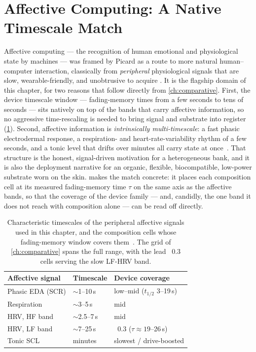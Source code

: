 \documentclass[12pt, twoside]{report}
\begin{document}
\section[Affective Computing]{Affective Computing: A Native Timescale Match}\label{sec:ch4_affect}

Affective computing --- the recognition of human emotional and physiological state by machines --- was framed by Picard as a route to more natural human--computer interaction, classically from \emph{peripheral} physiological signals that are slow, wearable-friendly, and unobtrusive to acquire \cite{Picard1997}. It is the flagship domain of this chapter, for two reasons that follow directly from \cref{ch:comparative}. First, the device timescale window --- fading-memory times from a few seconds to tens of seconds --- sits natively on top of the bands that carry affective information, so no aggressive time-rescaling is needed to bring signal and substrate into register (\cref{tab:ch4_bands}). Second, affective information is \emph{intrinsically multi-timescale}: a fast phasic electrodermal response, a respiration- and heart-rate-variability rhythm of a few seconds, and a tonic level that drifts over minutes all carry state at once~\cite{Boucsein2012EDA,TaskForce1996HRV,ChourpiliadisBhardwaj2022}. That structure is the honest, signal-driven motivation for a heterogeneous bank, and it is also the deployment narrative for an organic, flexible, biocompatible, low-power substrate worn on the skin.  makes the match concrete: it places each composition cell at its measured fading-memory time $\tau$ on the same axis as the affective bands, so that the coverage of the device family --- and, candidly, the one band it does not reach with composition alone --- can be read off directly.

\begin{table}[t]
  \centering
  \small
  \caption[Affective signal timescales and device coverage]{Characteristic timescales of the peripheral affective signals used in this chapter, and the composition cells whose fading-memory window covers them~\cite{Boucsein2012EDA,TaskForce1996HRV,ChourpiliadisBhardwaj2022}. The grid of \cref{ch:comparative} spans the full range, with the lead \PEO{}~0.3 cells serving the slow LF-HRV band.}
  \label{tab:ch4_bands}
  \setlength{\tabcolsep}{5pt}
  \begin{tabular}{lll}
    \toprule
    Affective signal & Timescale & Device coverage \\
    \midrule
    Phasic EDA (SCR) & $\sim$1--10\,s   & low--mid \PEO{} ($t_{1/2}$ 3--19\,s) \\
    Respiration      & $\sim$3--5\,s    & mid \PEO{} \\
    HRV, HF band     & $\sim$2.5--7\,s  & mid \PEO{} \\
    HRV, LF band     & $\sim$7--25\,s   & \PEO{}~0.3 ($\tau \approx 19$--26\,s) \\
    Tonic SCL        & minutes          & slowest / drive-boosted \\
    \bottomrule
  \end{tabular}
\end{table}
\end{document}
